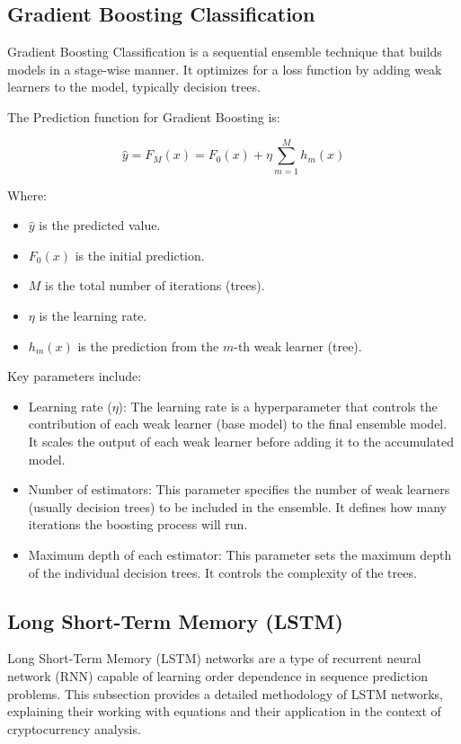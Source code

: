 \subsection{Gradient Boosting Classification}

Gradient Boosting Classification is a sequential ensemble technique that builds models in a stage-wise manner. It optimizes for a loss function by adding weak learners to the model, typically decision trees.

The Prediction function for Gradient Boosting is:

\[ \hat{y} = F_M(x) = F_0(x) + \eta \sum_{m=1}^M h_m(x) \]

Where:
\begin{itemize}
\item \( \hat{y} \) is the predicted value.
\item \( F_0(x) \) is the initial prediction.
\item \( M \) is the total number of iterations (trees).
\item \( \eta \) is the learning rate.
\item  \( h_m(x) \) is the prediction from the \( m \)-th weak learner (tree).
\end{itemize}

Key parameters include:
\begin{itemize}
    \item Learning rate ($\eta$): The learning rate is a hyperparameter that controls the contribution of each weak learner (base model) to the final ensemble model. It scales the output of each weak learner before adding it to the accumulated model.
    \item Number of estimators: This parameter specifies the number of weak learners (usually decision trees) to be included in the ensemble. It defines how many iterations the boosting process will run.
    \item Maximum depth of each estimator: This parameter sets the maximum depth of the individual decision trees. It controls the complexity of the trees.
\end{itemize}

\subsection{Long Short-Term Memory (LSTM)}

Long Short-Term Memory (LSTM) networks are a type of recurrent neural network (RNN) capable of learning order dependence in sequence prediction problems. This subsection provides a detailed methodology of LSTM networks, explaining their working with equations and their application in the context of cryptocurrency analysis.

